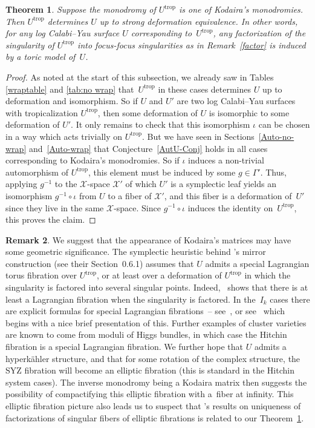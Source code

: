 \documentclass[pdftex]{sigma}
\numberwithin{equation}{section}
\numberwithin{figure}{section}
\numberwithin{table}{section}
\DeclareMathOperator{\trop}{trop}
\let\s=\mathcal
\newtheorem{thm}{Theorem}[section]
\theoremstyle{definition}
\newtheorem{rmk}[thm]{Remark}
\begin{document}
\begin{thm}\label{sing}Suppose the monodromy of $U^{\trop}$ is one of Kodaira's monodromies. Then $U^{\trop}$ determines $U$ up to strong deformation equivalence. In other words, for any log Calabi--Yau surface $U$ corresponding to~$U^{\trop}$, any factorization of the singularity of $U^{\trop}$ into focus-focus singularities as in Remark~{\rm \ref{factor}} is induced by a toric model of~$U$.
\end{thm}
\begin{proof}As noted at the start of this subsection, we already saw in Tables \ref{wraptable} and \ref{tab:no wrap} that~$U^{\trop}$ in these cases determines $U$ up to deformation and isomorphism. So if $U$ and $U'$ are two log Calabi--Yau surfaces with tropicalization $U^{\trop}$, then some deformation of $U$ is isomorphic to some deformation of $U'$. It only remains to check that this isomorphism $\iota$ can be chosen in a way which acts trivially on $U^{\trop}$. But we have seen in Sections~\ref{Auto-no-wrap} and~\ref{Auto-wrap} that Conjecture~\ref{AutU-Conj} holds in all cases corresponding to Kodaira's monodromies. So if $\iota$ induces a non-trivial automorphism of $U^{\trop}$, this element must be induced by some $g\in \Gamma'$. Thus, applying $g^{-1}$ to the $\s{X}$-space $\s{X}'$ of which $U'$ is a symplectic leaf yields an isomorphism $g^{-1}\circ \iota$ from $U$ to a fiber of $\s{X}'$, and this fiber is a deformation of~$U'$ since they live in the same $\s{X}$-space. Since $g^{-1}\circ \iota$ induces the identity on~$U^{\trop}$, this proves the claim.
\end{proof}

\begin{rmk}We suggest that the appearance of Kodaira's matrices may have some geometric significance. The symplectic heuristic behind \cite{GHK1}'s mirror construction (see their Section~0.6.1) assumes that $U$ admits a special Lagrangian torus fibration over $U^{\trop}$, or at least over a deformation of $U^{\trop}$ in which the singularity is factored into several singular points. Indeed, \cite{Sym}~shows that there is at least a Lagrangian fibration when the singularity is factored. In the~$I_k$ cases there are explicit formulas for special Lagrangian fibrations~-- see~\cite{GrSlag}, or see~\cite{CU} which begins with a nice brief presentation of this. Further examples of cluster varieties are known to come from moduli of Higgs bundles, in which case the Hitchin fibration is a special Lagrangian fibration. We further hope that $U$ admits a hyperk\"{a}hler structure, and that for some rotation of the complex structure, the SYZ fibration will become an elliptic fibration (this is standard in the Hitchin system cases). The inverse monodromy being a Kodaira matrix then suggests the possibility of compactifying this elliptic fibration with a~fiber at infinity. This elliptic fibration picture also leads us to suspect that \cite{CV}'s results on uniqueness of factorizations of singular fibers of elliptic fibrations is related to our Theorem~\ref{sing}.
\end{rmk}
\end{document}
